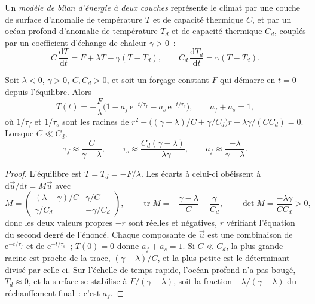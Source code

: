 \begin{definition}\label{def:b3:climate-models:two-layer}
Un \emph{modèle de bilan d'énergie à deux couches}
représente le climat par une couche de surface d'anomalie de température $T$
et de capacité thermique $C$, et par un océan profond d'anomalie de température $T_d$ et
de capacité thermique $C_d$, couplés par un coefficient d'échange de chaleur $\gamma > 0$~:
\[
C\,\frac{\mathrm dT}{\mathrm dt} = F + \lambda T - \gamma(T - T_d), \qquad
C_d\,\frac{\mathrm dT_d}{\mathrm dt} = \gamma(T - T_d) .
\]
\end{definition}

\begin{theorem}\label{thm:b3:climate-models:two-layer}
Soit $\lambda < 0$, $\gamma > 0$, $C, C_d > 0$, et soit un forçage constant
$F$ qui démarre en $t = 0$ depuis l'équilibre. Alors
\[
T(t) = -\frac{F}{\lambda}\Big(1 - a_f\,\mathrm e^{-t/\tau_f} - a_s\,\mathrm
e^{-t/\tau_s}\Big), \qquad a_f + a_s = 1 ,
\]
où $1/\tau_f$ et $1/\tau_s$ sont les racines de $r^2 - \big((\gamma -
\lambda)/C + \gamma/C_d\big)r - \lambda\gamma/(CC_d) = 0$. Lorsque $C \ll C_d$,
\[
\tau_f \approx \frac{C}{\gamma - \lambda}, \qquad
\tau_s \approx \frac{C_d(\gamma - \lambda)}{-\lambda\gamma}, \qquad
a_f \approx \frac{-\lambda}{\gamma - \lambda} .
\]
\end{theorem}

\begin{proof}
L'équilibre est $T = T_d = -F/\lambda$. Les écarts à celui-ci obéissent à
$\mathrm d\vec u/\mathrm dt = M\vec u$ avec
\[
M = \begin{pmatrix} (\lambda - \gamma)/C & \gamma/C\\ \gamma/C_d &
-\gamma/C_d\end{pmatrix}, \qquad
\operatorname{tr}M = -\frac{\gamma - \lambda}{C} - \frac{\gamma}{C_d},
\qquad \det M = \frac{-\lambda\gamma}{CC_d} > 0 ,
\]
donc les deux valeurs propres $-r$ sont réelles et négatives, $r$ vérifiant l'équation
du second degré de l'énoncé. Chaque composante de $\vec u$ est une combinaison de $\mathrm
e^{-t/\tau_f}$ et de $\mathrm e^{-t/\tau_s}$~; $T(0) = 0$ donne $a_f + a_s =
1$. Si $C \ll C_d$, la plus grande racine est proche de la trace, $(\gamma -
\lambda)/C$, et la plus petite est le déterminant divisé par celle-ci. Sur l'échelle de temps rapide,
l'océan profond n'a pas bougé, $T_d \approx 0$, et la surface
se stabilise à $F/(\gamma - \lambda)$, soit la fraction $-\lambda/(\gamma - \lambda)$
du réchauffement final~: c'est $a_f$.
\end{proof}

